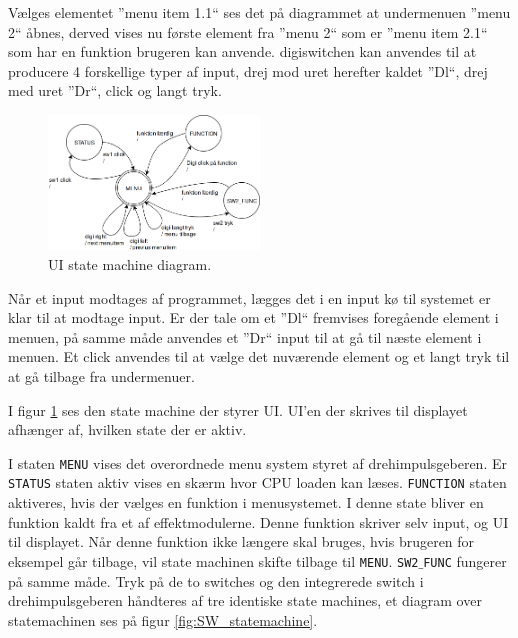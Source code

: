 Vælges elementet ''menu item 1.1`` ses det på diagrammet at undermenuen ''menu 2`` åbnes, derved vises nu første element fra ''menu 2`` som er ''menu item 2.1`` som har en funktion brugeren kan anvende.
digiswitchen kan anvendes til at producere 4 forskellige typer af input, drej mod uret herefter kaldet ''Dl``, drej med uret ''Dr``, click og langt tryk.


\begin{figure} 
	\centering 
	\includegraphics[width= 0.5\textwidth]{billeder/ui_statemachine.png} 
	\caption{UI state machine diagram. } 
	\label{fig:uistatemachine} 
\end{figure}

Når et input  modtages af programmet, lægges det i en input kø til systemet er klar til at modtage input.
Er der tale om et ''Dl`` fremvises foregående element i menuen, på samme måde anvendes et ''Dr`` input til at gå til næste element i menuen. 
Et click anvendes til at vælge det nuværende element og et langt tryk til at gå tilbage fra undermenuer.

I figur \ref{fig:uistatemachine} ses den state machine der styrer UI.
UI'en der skrives til displayet afhænger af, hvilken state der er aktiv.

I staten \texttt{MENU} vises det overordnede menu system styret af drehimpulsgeberen. 
Er \texttt{STATUS} staten aktiv vises en skærm hvor CPU loaden kan læses.
\texttt{FUNCTION} staten aktiveres, hvis der vælges en funktion i menusystemet. 
I denne state bliver en funktion kaldt fra et af effektmodulerne. 
Denne funktion skriver selv input, og UI til displayet.
Når denne funktion ikke længere skal bruges, hvis brugeren for eksempel går tilbage, vil state machinen skifte tilbage til \texttt{MENU}.
\texttt{SW2$\_$FUNC} fungerer på samme måde. \newline
Tryk på de to switches og den integrerede switch i drehimpulsgeberen håndteres af tre identiske state machines, et diagram over statemachinen ses på figur \ref{fig:SW_statemachine}.

